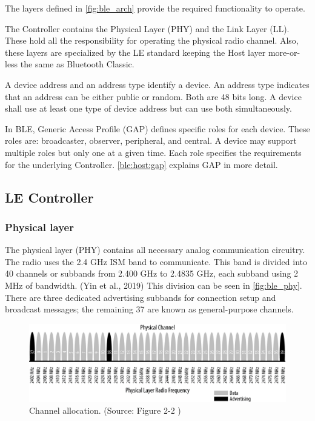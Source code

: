 The layers defined in \autoref{fig:ble_arch} provide the required functionality to operate.

The Controller contains the Physical Layer (PHY) and the Link Layer (LL).
These hold all the responsibility for operating the physical radio channel. 
Also, these layers are specialized by the LE standard keeping the Host
layer more-or-less the same as Bluetooth Classic.

A device address and an address type identify a device.
An address type indicates that an address can be either public or random.
Both are 48 bits long.
A device shall use at least one type of device address but can use
both simultaneously.

In BLE, Generic Access Profile (GAP) defines specific roles for each device.
These roles are: broadcaster, observer, peripheral, and central.
A device may support multiple roles but only one at a given time.
Each role specifies the requirements for the underlying Controller.
\autoref{ble:host:gap} explains GAP in more detail.

\subsection{LE Controller}
\label{ble:controller}
\subsubsection{Physical layer}
\label{ble:controller:phy}

The physical layer (PHY) contains all necessary analog communication circuitry.
The radio uses the 2.4 GHz ISM band to communicate.
This band is divided into 40 channels or subbands from 2.400 GHz to 2.4835 GHz,
each subband using 2 MHz of bandwidth. (Yin et al., 2019)
This division can be seen in \autoref{fig:ble_phy}.
There are three dedicated advertising subbands for connection setup and
broadcast messages; the remaining 37 are known as general-purpose channels.

\begin{figure}[!ht]
    \centering
    \includegraphics[width=150mm, keepaspectratio]{figures/ble_phy.png}
    \caption{Channel allocation. (Source: Figure 2-2 \cite{Townsend14})}
    \label{fig:ble_phy}
\end{figure}

